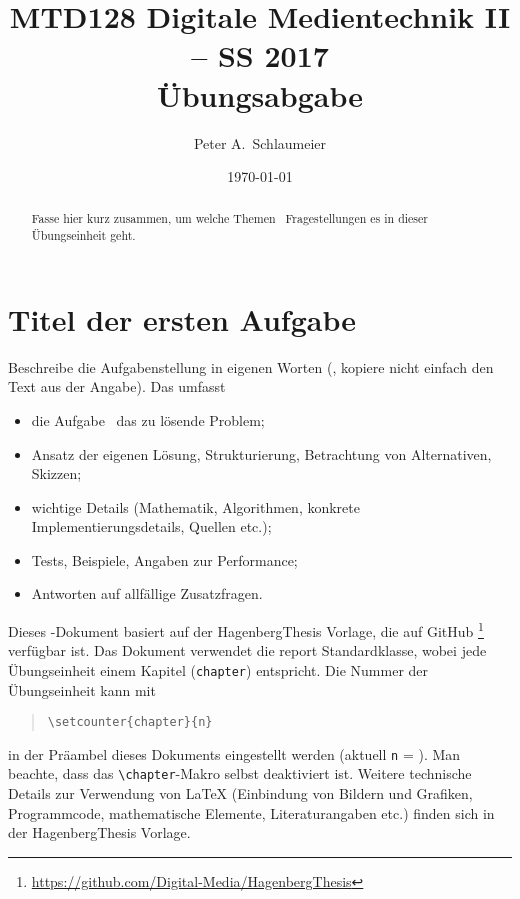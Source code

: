 \documentclass[german,notitlepage]{hgbreport}
\author{Peter A.\ Schlaumeier}
\title{MTD128 Digitale Medientechnik II -- SS 2017\\
				Übungsabgabe \arabic{chapter}}
\date{\today}
\renewcommand{\chapter}[1]{}	%
\begin{document}
\maketitle

\begin{abstract}\noindent
Fasse hier kurz zusammen, um welche Themen \bzw\ Fragestellungen 
es in dieser Übungseinheit geht.
\end{abstract}


\section{Titel der ersten Aufgabe}

Beschreibe die Aufgabenstellung in eigenen Worten 
(\dah, kopiere nicht einfach den Text aus der Angabe).
Das umfasst \ia 
\begin{itemize}
\item
	die Aufgabe \bzw\ das zu lösende Problem;
\item
	Ansatz der eigenen Lösung, Strukturierung, Betrachtung von Alternativen, Skizzen;
\item
	wichtige Details (Mathematik, Algorithmen, konkrete Implementierungsdetails,
	Quellen \cite{Sedgewick2011} %
	etc.);
\item
	Tests, Beispiele, Angaben zur Performance;
\item
	Antworten auf allfällige Zusatzfragen.
\end{itemize}
%
Dieses \latex-Dokument basiert auf der \textsf{HagenbergThesis} 
Vorlage, die auf GitHub%
\footnote{\url{https://github.com/Digital-Media/HagenbergThesis}}
verfügbar ist.
Das Dokument verwendet die \textsf{report} Standardklasse,
wobei jede Übungseinheit einem Kapitel (\texttt{chapter}) entspricht.
Die Nummer der Übungseinheit kann mit
\begin{quote}
\verb!\setcounter{chapter}{n}!
\end{quote}
in der Präambel dieses Dokuments eingestellt werden (aktuell \texttt{n} = ).
Man beachte, dass das \verb!\chapter!-Makro selbst deaktiviert ist.
Weitere technische Details zur Verwendung von LaTeX (Einbindung von Bildern und Grafiken,
Programmcode, mathematische Elemente, 
Literaturangaben etc.) finden sich in der \textsf{HagenbergThesis} Vorlage.
\end{document}
